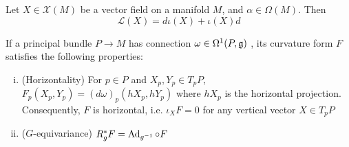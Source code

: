 \begin{thm} 
	\label{thm:cartan_homotopy} %
	Let $X\in \mathcal{X}(M)$ be a vector field on a manifold $M$, and 
	$\alpha\in \Omega(M)$. Then
	\[
	\mathcal{L}(X) = d\iota(X)+\iota(X) d
	\] 
	\begin{comment}
	\begin{enumerate}[(i)]
	    \item $\mathcal{L}(X)d = d\mathcal{L}(X)$
		\item $\mathcal{L}(X)(\iota(Y)\alpha) = \iota([X,Y])\alpha +
			\iota(Y)(\mathcal{L}(X)\alpha)$ 
		\item Cartan's homotopy formula: $\mathcal{L}(X) = d
			\cdot\iota(X)+\iota(X)\cdot d$
	\end{enumerate}
	\end{comment}
\end{thm}

\begin{thm} \label{thm:pb_curvature_properties}
	If a principal  bundle $P\to M$ has connection $\omega\in \Omega^1(P,\operatorname{\mathfrak{g}})$ ,
	its curvature form $F$ satisfies the following properties:
	\begin{enumerate}[(i)]
	    \item (Horizontality) For $p\in P$ and  $X_p,Y_p\in T_pP$,  $F_p(X_p,Y_p) =
			(d\omega)_p(hX_p,hY_p)$ where $hX_p$ is the horizontal projection.
		Consequently, $F$ is horizontal, i.e. $\iota_X F = 0$ for any vertical
		 vector  $X\in T_pP$
		\item ($G$-equivariance) $R_g^*F = \operatorname{Ad}_{g^{-1}}\circ F$
	\end{enumerate}
\end{thm}

